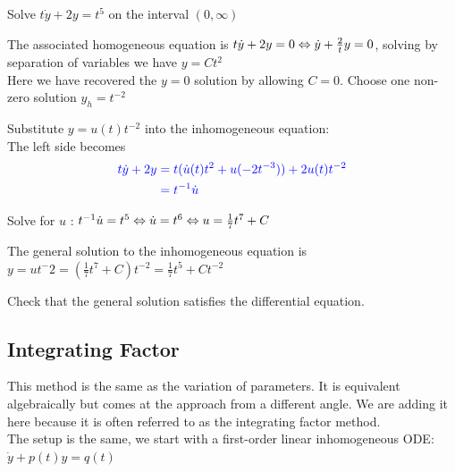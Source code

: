 \documentclass[11pt, openright]{book}
\begin{document}
\begin{dent}{}
    Solve $t\dot{y}+2y=t^5$ on the interval $(0,\infty)$

    \begin{items}{-15pt}{-15pt}
        \item The associated homogeneous equation is $t\dot{y}+2y=0 \Leftrightarrow \dot{y}+\frac{2}{t}y=0$, solving by separation of variables we have $y=Ct^2$\\
        Here we have recovered the $y=0$ solution by allowing $C=0$. Choose one non-zero solution $y_h=t^{-2}$
        \item Substitute $y=u(t)t^{-2}$ into the inhomogeneous equation:\\
        \tab The left side becomes \vspace{-15pt} \begin{align*}
            \color{blue} t\dot{y}+2y & \color{blue} =t(\dot{u}(t)t^2+u(-2t^{-3}))+2u(t)t^{-2} \\
                             & \color{blue}=t^{-1}\dot{u}
        \end{align*}
        \item Solve for $u$ : $t^{-1}\dot{u}=t^5\Leftrightarrow \dot{u}=t^6\Leftrightarrow u=\frac{1}{7}t^7+C$
        \item The general solution to the inhomogeneous equation is $y=ut^-2=(\frac{1}{7}t^7+C)t^{-2}=\boxed{\frac{1}{7}t^5+Ct^{-2}}$
        \item Check that the general solution satisfies the differential equation.
    \end{items}
\end{dent}

\newpage

\subsection{Integrating Factor}

This method is the same as the variation of parameters. It is equivalent algebraically but comes at the approach from a different angle. We are adding it here because it is often referred to as the integrating factor method.\\
The setup is the same, we start with a first-order linear inhomogeneous ODE: $\dot{y}+p(t)y=q(t)$
\end{document}
